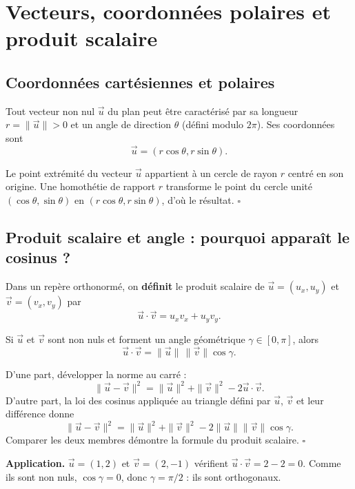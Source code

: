 \documentclass[../cours_spe_trigo.tex]{subfiles}
\begin{document}
\setcounter{chapter}{12}
\chapter{Vecteurs, coordonnées polaires et produit scalaire}
\section{Coordonnées cartésiennes et polaires}
Tout vecteur non nul $\vec u$ du plan peut être caractérisé par sa longueur $r=\|\vec u\|>0$ et un angle de direction $\theta$ (défini modulo $2\pi$). Ses coordonnées sont
\[\boxed{\vec u=(r\cos\theta,r\sin\theta).}\]
\begin{demonstration}
Le point extrémité du vecteur $\vec u$ appartient à un cercle de rayon $r$ centré en son origine. Une homothétie de rapport $r$ transforme le point du cercle unité $(\cos\theta,\sin\theta)$ en $(r\cos\theta,r\sin\theta)$, d'où le résultat. $\square$
\end{demonstration}
\section{Produit scalaire et angle : pourquoi apparaît le cosinus ?}
Dans un repère orthonormé, on \textbf{définit} le produit scalaire de $\vec u=(u_x,u_y)$ et $\vec v=(v_x,v_y)$ par
\[\vec u\cdot\vec v=u_xv_x+u_yv_y.\]
\begin{propriete}
Si $\vec u$ et $\vec v$ sont non nuls et forment un angle géométrique $\gamma\in[0,\pi]$, alors
\[\boxed{\vec u\cdot\vec v=\|\vec u\|\,\|\vec v\|\cos\gamma.}\]
\end{propriete}
\begin{demonstration}
D'une part, développer la norme au carré :
\[
\|\vec u-\vec v\|^2=\|\vec u\|^2+\|\vec v\|^2-2\vec u\cdot\vec v.
\]
D'autre part, la loi des cosinus appliquée au triangle défini par $\vec u$, $\vec v$ et leur différence donne
\[
\|\vec u-\vec v\|^2=\|\vec u\|^2+\|\vec v\|^2-2\|\vec u\|\|\vec v\|\cos\gamma.
\]
Comparer les deux membres démontre la formule du produit scalaire. $\square$
\end{demonstration}
\textbf{Application.} $\vec u=(1,2)$ et $\vec v=(2,-1)$ vérifient $\vec u\cdot\vec v=2-2=0$. Comme ils sont non nuls, $\cos\gamma=0$, donc $\gamma=\pi/2$ : ils sont orthogonaux.
\end{document}
